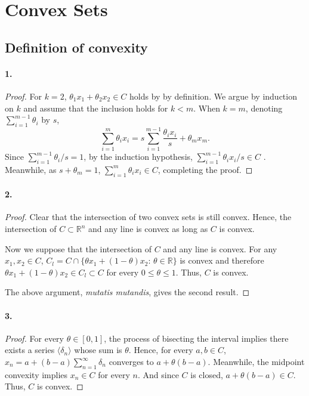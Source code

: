 \section{Convex Sets}

\subsection{Definition of convexity}
  \paragraph{1.}
  \begin{proof}
    For $k=2$, $\theta_1x_1+\theta_2x_2\in C$ holds by by definition. We argue by
    induction on $k$ and assume that the inclusion holds for $k<m$. When $k=m$,
    denoting $\sum_{i=1}^{m-1}\theta_i$ by $s$,
    \[
      \sum_{i=1}^m \theta_ix_i = 
      s\sum_{i=1}^{m-1}\frac{\theta_ix_i}{s} + \theta_mx_m.
    \]
    Since $\sum_{i=1}^{m-1}\theta_i/s=1$, by the induction hypothesis,
    $\sum_{i=1}^{m-1}\theta_ix_i/s\in C$ . Meanwhile, as $s+\theta_m=1$, 
    $\sum_{i=1}^m\theta_ix_i\in C$, completing the proof.
  \end{proof}

  \paragraph{2.}
  \begin{proof}
    Clear that the intersection of two convex sets is still convex. Hence, the 
    intersection of $C\subset\mathbb{R}^n$ and any line is convex as long as $C$
    is convex.\par
    Now we suppose that the intersection of $C$ and any line is convex. For any 
    $x_1,x_2\in C$, $C_l=C\cap\{\theta x_1+(1-\theta)x_2:\,\theta\in\mathbb{R}\}$
    is convex and therefore $\theta x_1+(1-\theta)x_2\in C_l\subset C$ for every 
    $0\le\theta\le 1$. Thus, $C$ is convex.\par
    The above argument, \textit{mutatis mutandis}, gives the second result.
  \end{proof}

  \paragraph{3.}
  \begin{proof}
    For every $\theta\in[0,1]$, the process of bisecting the interval implies 
    there exists a series $\langle\delta_n\rangle$ whose sum is $\theta$. Hence,
    for every $a,b\in C$, $x_n = a+(b-a)\sum_{n=1}^\infty\delta_n$ converges to
    $a+\theta(b-a)$. Meanwhile, the midpoint convexity implies $x_n\in C$ for 
    every $n$. And since $C$ is closed, $a+\theta(b-a)\in C$. Thus, $C$ is 
    convex.
  \end{proof}

